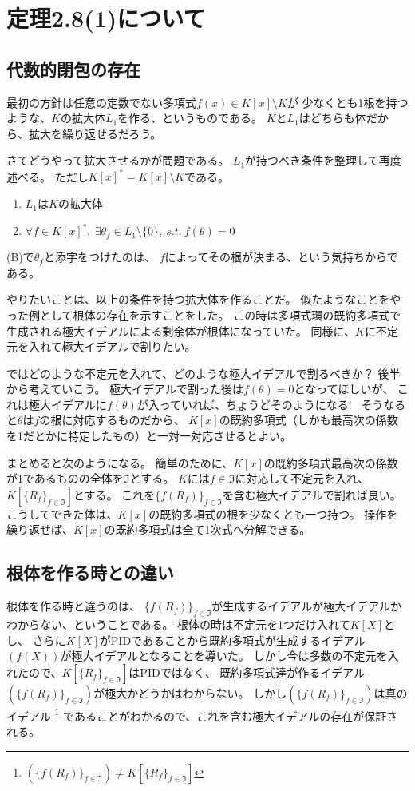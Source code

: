 \documentclass[a4j]{jarticle}
\begin{document}
    \section{定理2.8(1)について}
    \subsection{代数的閉包の存在}
    最初の方針は任意の定数でない多項式$f(x) \in  K[x] \setminus K$が
    少なくとも1根を持つような、$K$の拡大体$L_1$を作る、というものである。
    $K$と$L_1$はどちらも体だから、拡大を繰り返せるだろう。

    さてどうやって拡大させるかが問題である。
    $L_1$が持つべき条件を整理して再度述べる。
    ただし$K[x]^{\ast}=K[x] \setminus K$である。
    \begin{enumerate}
        \renewcommand{\labelenumi}{(\Alph{enumi})}
        \item $L_1$は$K$の拡大体
        \item $\forall f \in K[x]^{\ast},~ \exists \theta_{f} \in L_1 \setminus \{ 0 \}, ~s.t.~ f(\theta)=0$
    \end{enumerate}
    (B)で$\theta_{f}$と添字をつけたのは、
    $f$によってその根が決まる、という気持ちからである。

    やりたいことは、以上の条件を持つ拡大体を作ることだ。
    似たようなことをやった例として根体の存在を示すことをした。
    この時は多項式環の既約多項式で生成される極大イデアルによる剰余体が根体になっていた。
    同様に、$K$に不定元を入れて極大イデアルで割りたい。

    ではどのような不定元を入れて、どのような極大イデアルで割るべきか？
    後半から考えていこう。
    極大イデアルで割った後は$f(\theta)=0$となってほしいが、
    これは極大イデアルに$f(\theta)$が入っていれば、ちょうどそのようになる!~
    そうなると$\theta$は$f$の根に対応するものだから、
    $K[x]$の既約多項式（しかも最高次の係数を1だとかに特定したもの）と一対一対応させるとよい。

    まとめると次のようになる。
    簡単のために、$K[x]$の既約多項式最高次の係数が1であるものの全体を$\Im$とする。
    $K$には$f \in \Im$に対応して不定元を入れ、$K[\{R_f\}_{f \in \Im}]$とする。
    これを$\{f(R_f)\}_{f \in \Im}$を含む極大イデアルで割れば良い。
    こうしてできた体は、$K[x]$の既約多項式の根を少なくとも一つ持つ。
    操作を繰り返せば、$K[x]$の既約多項式は全て1次式へ分解できる。

    \subsection{根体を作る時との違い}
    根体を作る時と違うのは、
    $\{f(R_f)\}_{f \in \Im}$が生成するイデアルが極大イデアルかわからない、ということである。
    根体の時は不定元を1つだけ入れて$K[X]$とし、
    さらに$K[X]$がPIDであることから既約多項式が生成するイデアル$(f(X))$が極大イデアルとなることを導いた。
    しかし今は多数の不定元を入れたので、$K[\{R_f\}_{f \in \Im}]$はPIDではなく、
    既約多項式達が作るイデアル$(\{f(R_f)\}_{f \in \Im})$が極大かどうかはわからない。
    しかし$(\{f(R_f)\}_{f \in \Im})$は真のイデアル
        \footnote{$(\{f(R_f)\}_{f \in \Im}) \neq K[\{R_f\}_{f \in \Im}]$}
    であることがわかるので、これを含む極大イデアルの存在が保証される。
\end{document}
